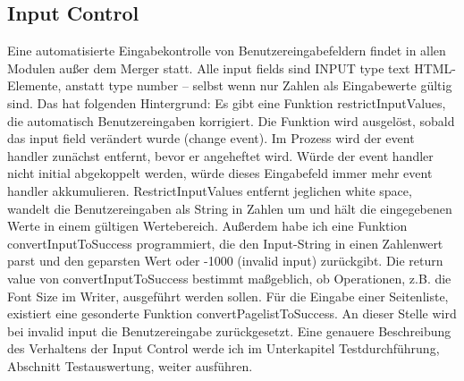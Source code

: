 \subsection{Input Control}
Eine automatisierte Eingabekontrolle von Benutzereingabefeldern findet in allen Modulen außer dem Merger statt. Alle input fields sind INPUT type text HTML-Elemente, anstatt type number – selbst wenn nur Zahlen als Eingabewerte gültig sind. Das hat folgenden Hintergrund: Es gibt eine Funktion restrictInputValues, die automatisch Benutzereingaben korrigiert. Die Funktion wird ausgelöst, sobald das input field verändert wurde (change event). Im Prozess wird der event handler zunächst entfernt, bevor er angeheftet wird. Würde der event handler nicht initial abgekoppelt werden, würde dieses Eingabefeld immer mehr event handler akkumulieren. RestrictInputValues entfernt jeglichen white space, wandelt die Benutzereingaben als String in Zahlen um und hält die eingegebenen Werte in einem gültigen Wertebereich. Außerdem habe ich eine Funktion convertInputToSuccess programmiert, die den Input-String in einen Zahlenwert parst und den geparsten Wert oder -1000 (invalid input) zurückgibt. Die return value von convertInputToSuccess bestimmt maßgeblich, ob Operationen, z.B. die Font Size im Writer, ausgeführt werden sollen. Für die Eingabe einer Seitenliste, existiert eine gesonderte Funktion convertPagelistToSuccess. An dieser Stelle wird bei invalid input die Benutzereingabe zurückgesetzt. Eine genauere Beschreibung des Verhaltens der Input Control werde ich im Unterkapitel Testdurchführung, Abschnitt Testauswertung, weiter ausführen.

